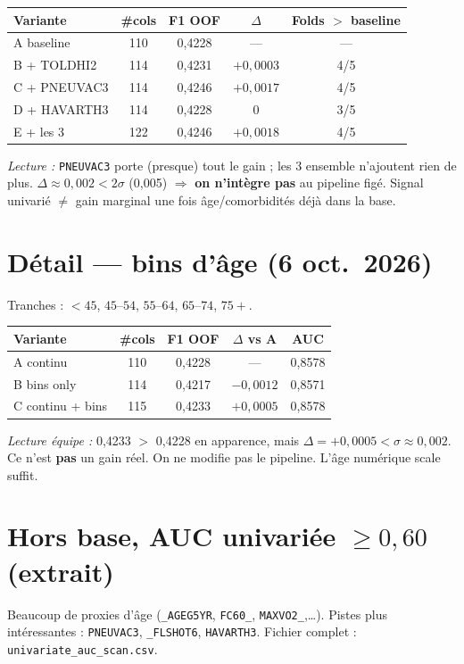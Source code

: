 \documentclass[11pt,a4paper]{article}
\begin{document}
\begin{center}
\begin{tabular}{@{}lcccc@{}}
\toprule
Variante & \#cols & F1 OOF & $\Delta$ & Folds $>$ baseline \\
\midrule
A baseline & 110 & 0{,}4228 & --- & --- \\
B + TOLDHI2 & 114 & 0{,}4231 & $+0{,}0003$ & 4/5 \\
C + PNEUVAC3 & 114 & 0{,}4246 & $+0{,}0017$ & 4/5 \\
D + HAVARTH3 & 114 & 0{,}4228 & $0$ & 3/5 \\
E + les 3 & 122 & 0{,}4246 & $+0{,}0018$ & 4/5 \\
\bottomrule
\end{tabular}
\end{center}

\noindent\textit{Lecture :} \texttt{PNEUVAC3} porte (presque) tout le gain ; les 3 ensemble
n'ajoutent rien de plus. $\Delta\approx0{,}002 < 2\sigma$ (0{,}005) $\Rightarrow$
\textbf{on n'intègre pas} au pipeline figé. Signal univarié $\neq$ gain marginal
une fois âge/comorbidités déjà dans la base.

\section{Détail --- bins d'âge (6 oct.\ 2026)}
Tranches : $<45$, $45$--$54$, $55$--$64$, $65$--$74$, $75+$.

\begin{center}
\begin{tabular}{@{}lcccc@{}}
\toprule
Variante & \#cols & F1 OOF & $\Delta$ vs A & AUC \\
\midrule
A continu & 110 & 0{,}4228 & --- & 0{,}8578 \\
B bins only & 114 & 0{,}4217 & $-0{,}0012$ & 0{,}8571 \\
C continu + bins & 115 & 0{,}4233 & $+0{,}0005$ & 0{,}8578 \\
\bottomrule
\end{tabular}
\end{center}

\noindent\textit{Lecture équipe :} 0{,}4233 $>$ 0{,}4228 en apparence, mais
$\Delta=+0{,}0005 < \sigma\approx0{,}002$. Ce n'est \textbf{pas} un gain réel.
On ne modifie pas le pipeline. L'âge numérique scale suffit.

\section{Hors base, AUC univariée $\ge 0{,}60$ (extrait)}
Beaucoup de proxies d'âge (\texttt{\_AGEG5YR}, \texttt{FC60\_}, \texttt{MAXVO2\_},\ldots).
Pistes plus intéressantes : \texttt{PNEUVAC3}, \texttt{\_FLSHOT6}, \texttt{HAVARTH3}.
Fichier complet : \texttt{univariate\_auc\_scan.csv}.
\end{document}
